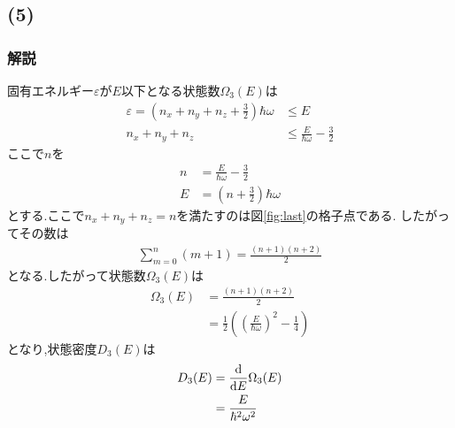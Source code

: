\subsection*{(5)}
\subsubsection*{解説}
固有エネルギー$\varepsilon$が$E$以下となる状態数$\Omega_3(E)$は
\begin{align}
  \varepsilon=\left(n_x+n_y+n_z+\frac{3}{2}\right)\hbar\omega&\leq E\\
  n_x+n_y+n_z&\leq \frac{E}{\hbar\omega}-\frac{3}{2}
\end{align}
ここで$n$を
\begin{align}
  n&=\frac{E}{\hbar\omega}-\frac{3}{2}\\
  E&=(n+\frac{3}{2})\hbar\omega
\end{align}
とする.ここで$n_x+n_y+n_z=n$を満たすのは図\ref{fig:last}の格子点である.
したがってその数は
\begin{align*}
  \sum_{m=0}^{n}(m+1)=\frac{(n+1)(n+2)}{2}
\end{align*}
となる.したがって状態数$\Omega_3(E)$は
\begin{align}
  \Omega_3(E)&=\frac{(n+1)(n+2)}{2}\\
  &=\frac{1}{2}\left(\left(\frac{E}{\hbar\omega}\right)^2-\frac{1}{4}\right)
\end{align}
となり,状態密度$D_3(E)$は
\begin{align}
  D_3(E)&=\frac{{\rm d}}{{\rm d}E}\Omega_3(E)\\
  &=\frac{E}{\hbar^2\omega^2}
\end{align}


